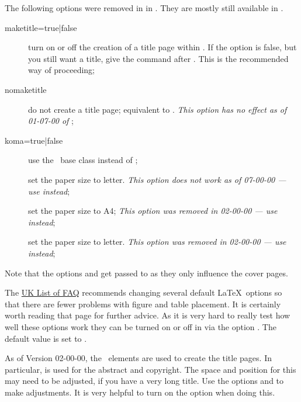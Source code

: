 The following options were removed in  in .
They are mostly still available in .
\begin{description}
\item[maketitle={\normalfont true}|false] turn on or off the creation of a title page within .
  If the option is false, but you still want a title, give the command  after
  \verb||.
  This is the recommended way of proceeding;
\item[nomaketitle] do not create a title page; equivalent to .
  \emph{This option has no effect as of  01-07-00 of };
\item[koma=true|{\normalfont false}] use the \KOMAScript\ base class  instead of ;
\item[] set the paper size to letter.
  \emph{This option does not work as of  07-00-00
  --- use  instead};
\item[] set the paper size to A4;
  \emph{This option was removed in  02-00-00
  --- use  instead};
\item[] set the paper size to letter.
  \emph{This option was removed in  02-00-00
  --- use  instead};
\end{description}
Note that the options  and  get passed to 
as they only influence the cover pages.

The
\href{http://www.tex.ac.uk/cgi-bin/texfaq2html?label=floats}{UK List of FAQ}
recommends changing several default \LaTeX\ options so that there are fewer problems
with figure and table placement.
It is certainly worth reading that page for further advice.
As it is very hard to really test how well these options work
they can be turned on or off in  via the option .
The default value is set to .

As of  Version 02-00-00,
the \KOMAScript\ elements are used to create the title pages.
In particular,  is used for the abstract and copyright.
The space and position for this may need to be adjusted,
if you have a very long title. Use the options
 and  to make adjustments.
It is very helpful to turn on the  option when doing this.


